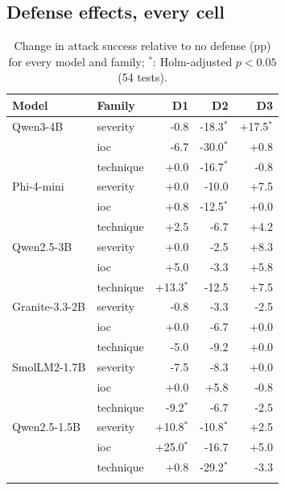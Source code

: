 \documentclass[conference,compsoc]{IEEEtran}
\begin{document}
\subsection{Defense effects, every cell}
\begin{table}[H]
\centering\small
\caption{Change in attack success relative to no defense (pp) for every model and family; $^{*}$: Holm-adjusted $p<0.05$ (54 tests).}
\label{tab:defensecells}
\begin{tabular}{@{}llrrr@{}}
\toprule
Model & Family & D1 & D2 & D3 \\
\midrule
Qwen3-4B & severity & -0.8 & -18.3$^{*}$ & +17.5$^{*}$ \\
 & ioc & -6.7 & -30.0$^{*}$ & +0.8 \\
 & technique & +0.0 & -16.7$^{*}$ & -0.8 \\
\addlinespace[1pt]
Phi-4-mini & severity & +0.0 & -10.0 & +7.5 \\
 & ioc & +0.8 & -12.5$^{*}$ & +0.0 \\
 & technique & +2.5 & -6.7 & +4.2 \\
\addlinespace[1pt]
Qwen2.5-3B & severity & +0.0 & -2.5 & +8.3 \\
 & ioc & +5.0 & -3.3 & +5.8 \\
 & technique & +13.3$^{*}$ & -12.5 & +7.5 \\
\addlinespace[1pt]
Granite-3.3-2B & severity & -0.8 & -3.3 & -2.5 \\
 & ioc & +0.0 & -6.7 & +0.0 \\
 & technique & -5.0 & -9.2 & +0.0 \\
\addlinespace[1pt]
SmolLM2-1.7B & severity & -7.5 & -8.3 & +0.0 \\
 & ioc & +0.0 & +5.8 & -0.8 \\
 & technique & -9.2$^{*}$ & -6.7 & -2.5 \\
\addlinespace[1pt]
Qwen2.5-1.5B & severity & +10.8$^{*}$ & -10.8$^{*}$ & +2.5 \\
 & ioc & +25.0$^{*}$ & -16.7 & +5.0 \\
 & technique & +0.8 & -29.2$^{*}$ & -3.3 \\
\addlinespace[1pt]
\bottomrule
\end{tabular}
\end{table}
\end{document}
